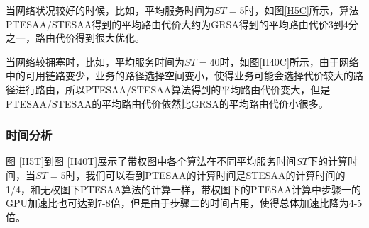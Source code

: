 当网络状况较好的时候，比如，平均服务时间为$ST=5$时，如图\ref{H5C}所示，算法PTESAA/STESAA得到的平均路由代价大约为GRSA得到的平均路由代价3到4分之一，路由代价得到很大优化。

当网络较拥塞时，比如，平均服务时间为$ST=40$时，如图\ref{H40C}所示，由于网络中的可用链路变少，业务的路径选择空间变小，使得业务可能会选择代价较大的路径进行路由，所以PTESAA/STESAA算法得到的平均路由代价变大，但是PTESAA/STESAA的平均路由代价依然比GRSA的平均路由代价小很多。

\subsubsection{时间分析}
图 \ref{H5T}到图 \ref{H40T}展示了带权图中各个算法在不同平均服务时间$ST$下的计算时间，当$ST=5$时，我们可以看到PTESAA的计算时间是STESAA的计算时间的1/4，和无权图下PTESAA算法的计算一样，带权图下的PTESAA计算中步骤一的GPU加速比也可达到7-8倍，但是由于步骤二的时间占用，使得总体加速比降为4-5倍。

